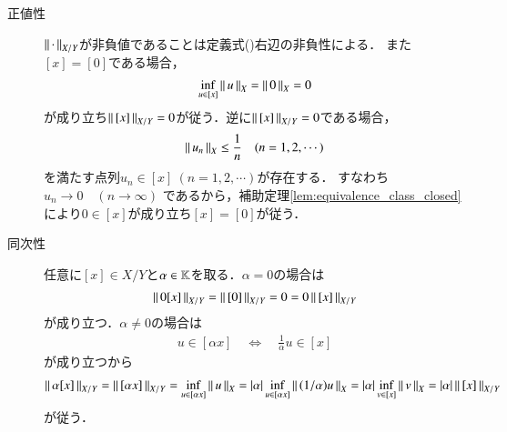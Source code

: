 	\begin{prf}\mbox{}
		\begin{description}
			\item[正値性]
				$\left\|\, \cdot\, \right\|_{X/Y}$が非負値であることは定義式()右辺の非負性による．
				また$[x] = [0]$である場合，
				\begin{align}
					\operatorname*{inf}_{u \in [x]} \left\|\, u\, \right\|_{X} = \left\|\, 0\, \right\|_{X} = 0
				\end{align}
				が成り立ち$\left\|\, [x]\, \right\|_{X/Y} = 0$が従う．逆に$\left\|\, [x]\, \right\|_{X/Y} = 0$である場合，
				\begin{align}
					\left\|\, u_n\, \right\|_{X} \leq \frac{1}{n} \quad (n=1,2,\cdots)
				\end{align}
				を満たす点列$u_n \in [x]\ (n=1,2,\cdots)$が存在する．
				すなわち$u_n \longrightarrow 0 \quad (n \longrightarrow \infty)$
				であるから，補助定理\ref{lem:equivalence_class_closed}により$0 \in [x]$が成り立ち$[x] = [0]$が従う．
				
			\item[同次性]
				任意に$[x] \in X/Y$と$\alpha \in \mathbb{K}$を取る．$\alpha = 0$の場合は
				\begin{align}
					\left\|\, 0 [x]\, \right\|_{X/Y} = \left\|\, [0]\, \right\|_{X/Y} = 0 = 0 \left\|\, [x]\, \right\|_{X/Y}
				\end{align}
				が成り立つ．$\alpha \neq 0$の場合は
				\begin{align}
					u \in [\alpha x] \quad \Leftrightarrow \quad \frac{1}{\alpha} u \in [x]
				\end{align}
				が成り立つから
				\begin{align}
					\left\|\, \alpha [x]\, \right\|_{X/Y} = \left\|\, [\alpha x]\, \right\|_{X/Y} = \operatorname*{inf}_{u \in [\alpha x]} \left\|\, u\, \right\|_{X}
					= |\alpha| \operatorname*{inf}_{u \in [\alpha x]} \left\|\, (1/\alpha)u\, \right\|_{X}
					= |\alpha| \operatorname*{inf}_{v \in [x]} \left\|\, v\, \right\|_{X}
					= |\alpha |\left\|\, [x]\, \right\|_{X/Y}
				\end{align}
				が従う．
			

\end{description}
\end{prf}
